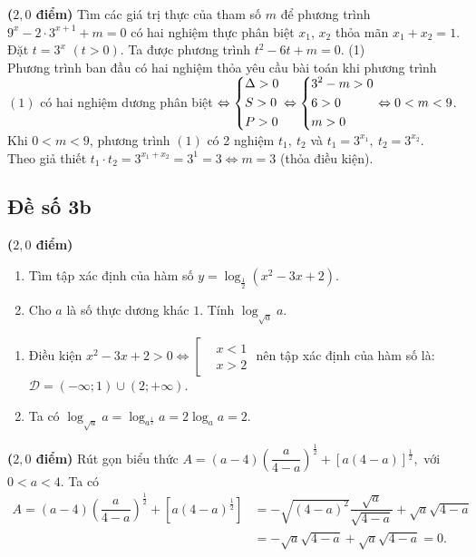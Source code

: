 \begin{bt}\textbf{($2,0$ điểm)}%
	Tìm các giá trị thực của tham số $m$ để phương trình $9^x - 2 \cdot 3^{x+1} + m = 0$ có hai nghiệm thực phân biệt $x_1$, $x_2$ thỏa mãn $x_1 + x_2 =1$.
	\loigiai
	{
		Đặt $ t = 3^x$ $(t > 0)$. Ta được phương trình $t^2 - 6t + m = 0$. \hfill (1)\\
		Phương trình ban đầu có hai nghiệm thỏa yêu cầu bài toán khi phương trình $(1)$ có hai nghiệm dương phân biệt $\Leftrightarrow \left\{\begin{aligned}& \Delta > 0 \\ & S > 0 \\ & P > 0\end{aligned}\right.
		\Leftrightarrow \left\{\begin{aligned}& 3^2 - m > 0 \\ & 6 > 0 \\ & m > 0\end{aligned}\right.  
		\Leftrightarrow 0<m<9$.\\
		Khi $0<m<9$, phương trình $(1)$ có 2 nghiệm $t_1,\ t_2$ và $t_1=3^{x_1},\ t_2=3^{x_2}$.\\
		Theo giả thiết $t_1\cdot t_2=3^{x_1+x_2}=3^1=3 \Leftrightarrow m=3$ (thỏa điều kiện).	
	}	
\end{bt}

\subsection{Đề số 3b}
\setcounter{bt}{0}

\begin{bt}\textbf{($2,0$ điểm)}%
	\begin{enumerate}
		\item Tìm tập xác định của hàm số $y=\log_{\frac12}\left(x^2-3x+2\right)$.
		\item Cho $a$ là số thực dương khác $1$. Tính $\log_{\sqrt{a}}a.$
	\end{enumerate}	
	\loigiai
	{
		\begin{enumerate}	
			\item Điều kiện 
			$x^2-3x+2>0\Leftrightarrow \left[\begin{aligned}
			&x<1\\&x>2
			\end{aligned}\right.$ nên tập xác định của hàm số là: $\mathscr{D} =(-\infty;1)\cup(2;+\infty)$.
			\item Ta có $\log_{\sqrt{a}}a = \log _{a^{\tfrac{1}{2}}} a=2\log _a a=2.$
		\end{enumerate}	
	}
\end{bt}

\begin{bt}\textbf{($2,0$ điểm)}%
	Rút gọn biểu thức $A=(a-4)\left(\dfrac{a}{4-a}\right)^{\frac{1}{2}}+\left[a(4-a)\right]^{\frac{1}{2}},$ với $0<a<4.$
	\loigiai
	{
		Ta có
		\begin{align*} 
			A=(a-4)\left(\dfrac{a}{4-a}\right)^{\frac{1}{2}}+\left[a(4-a)^{\frac{1}{2}}\right]
			&=-\sqrt{(4-a)^2}\dfrac{\sqrt{a}}{\sqrt{4-a}}+\sqrt{a} \sqrt{4-a} \\
			&=-\sqrt{a}   \sqrt{4-a}+\sqrt{a}  \sqrt{4-a}=0.
		\end{align*}
	}
\end{bt}

